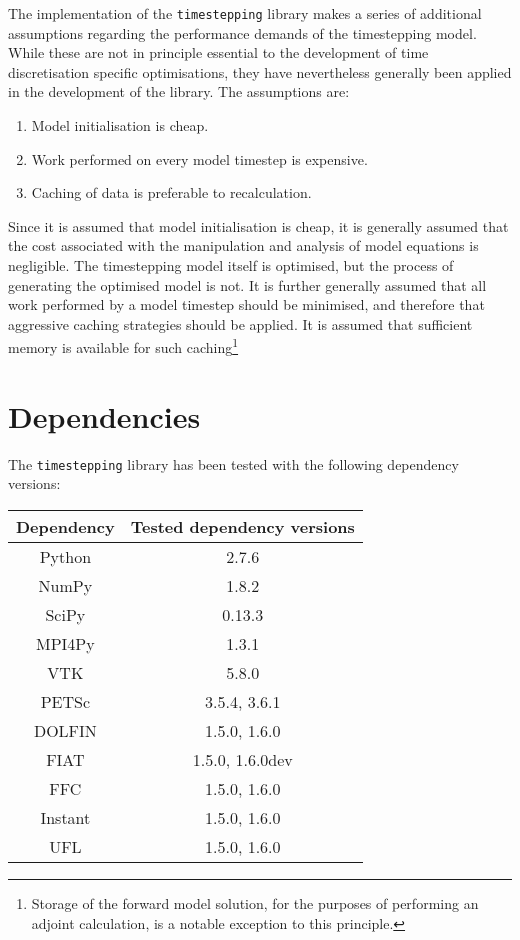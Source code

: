 \documentclass[a4paper]{book}
\begin{document}
The implementation of the \verb+timestepping+ library makes a series of
additional assumptions regarding the performance demands of the timestepping
model. While these are not in principle essential to the development of time
discretisation specific optimisations, they have nevertheless generally been
applied in the development of the library. The assumptions are:
\begin{enumerate}
  \item Model initialisation is cheap.
  \item Work performed on every model timestep is expensive.
  \item Caching of data is preferable to recalculation.
\end{enumerate}
Since it is assumed that model initialisation is cheap, it is generally assumed
that the cost associated with the manipulation and analysis of model equations
is negligible. The timestepping model itself is optimised, but the process of
generating the optimised model is not. It is further generally assumed that
all work performed by a model timestep should be minimised, and therefore
that aggressive caching strategies should be applied. It is assumed that
sufficient memory is available for such caching\footnote{Storage of the forward
model solution, for the purposes of performing an adjoint calculation, is a
notable exception to this principle.}

\section{Dependencies}

The \verb+timestepping+ library has been tested with the following dependency
versions:

\begin{center}
\begin{tabular}{| c | c | }
\hline
Dependency  & Tested dependency versions \\
\hline
Python  & 2.7.6 \\
\hline
NumPy  & 1.8.2 \\
SciPy  & 0.13.3 \\
MPI4Py & 1.3.1 \\
VTK    & 5.8.0 \\
PETSc  & 3.5.4, 3.6.1 \\
\hline
DOLFIN   & 1.5.0, 1.6.0 \\
FIAT     & 1.5.0, 1.6.0dev \\
FFC      & 1.5.0, 1.6.0 \\
Instant  & 1.5.0, 1.6.0 \\
UFL      & 1.5.0, 1.6.0 \\
\hline
\end{tabular}
\end{center}
\end{document}
